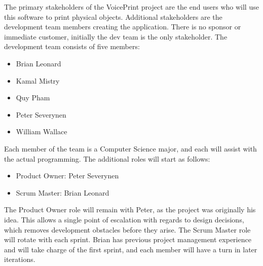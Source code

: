 The primary stakeholders of the VoicePrint project are the end users who will use this software to print physical objects. Additional stakeholders are the development team members creating the application. There is no sponsor or immediate customer, initially the dev team is the only stakeholder.
The development team consists of five members:
\begin{itemize}
    \item Brian Leonard
    \item Kamal Mistry
    \item Quy Pham
    \item Peter Severynen
    \item William Wallace
\end{itemize}
Each member of the team is a Computer Science major, and each will assist with the actual programming. The additional roles will start as follows:
\begin{itemize}
  \item Product Owner: Peter Severynen
  \item Scrum Master: Brian Leonard
\end{itemize}
The Product Owner role will remain with Peter, as the project was originally his idea. This allows a single point of escalation with regards to design decisions, which removes development obstacles before they arise.
The Scrum Master role will rotate with each sprint. Brian has previous project management experience and will take charge of the first sprint, and each member will have a turn in later iterations.